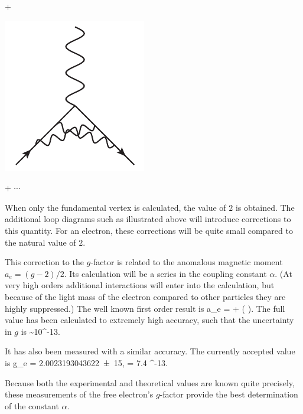 {\begin{minipage}{1in}
\end{minipage}
+
\begin{minipage}{1in}
   \begin{center} \includegraphics[scale=0.5]{eps/QEDloop2} \end{center} 
\end{minipage}
+ \hspace{2em} $\cdots$
 }
\vspace{1em} 
 
When only the fundamental vertex is calculated, the value of $2$ is obtained.  The additional loop diagrams such as illustrated above will introduce corrections to this quantity.  For an electron, these corrections will be quite small compared to the natural value of $2$. 
 
 
 
This correction to the $g$-factor is related to the anomalous magnetic moment $a_e = (g-2)/2$.  Its calculation will be a series in the coupling constant $\alpha$.   (At very high orders additional interactions will enter into the calculation, but because of the light mass of the electron compared to other particles they are highly suppressed.)  The well known first order result is
 \beq
 	a_e = \frac{\alpha}{2\pi} + ( ).
 \eeq
The full value has been calculated to extremely high accuracy, such that the uncertainty in $g$ is 
\beq
	 \sim 10^{-13}.
\eeq

It has also been measured with a similar accuracy.  The currently accepted value \cite{Gabrielse:2006gg} is 
\beq
	g_e = \num{2.002 319 304 3622(15)},    \hspace{2em} \delta = 7.4 ^{-13}.
\eeq

Because both the experimental and theoretical values are known quite precisely, these measurements of the free electron's $g$-factor provide the best determination of the constant $\alpha$.  


